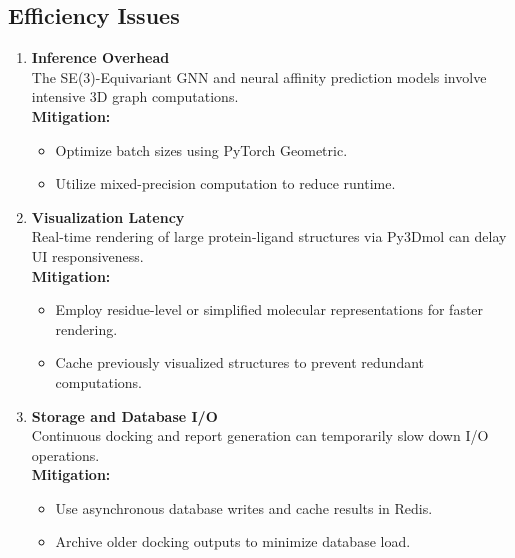 \documentclass[12pt,a4]{report}
\begin{document}
\subsection{Efficiency Issues}
\begin{enumerate}[label=\textbf{\Alph*.}, leftmargin=1.2cm]

    \item \textbf{Inference Overhead} \\
    \hspace{0.3in}
    The SE(3)-Equivariant GNN and neural affinity prediction models involve intensive 3D graph computations. \\
    \hspace{0.3in}
    \textbf{Mitigation:}
    \begin{itemize}
        \item Optimize batch sizes using PyTorch Geometric.
        \item Utilize mixed-precision computation to reduce runtime.
    \end{itemize}

    \vspace{0.4cm}
    \item \textbf{Visualization Latency} \\
    \hspace{0.3in}
    Real-time rendering of large protein-ligand structures via Py3Dmol can delay UI responsiveness. \\
    \hspace{0.3in}
    \textbf{Mitigation:}
    \begin{itemize}
        \item Employ residue-level or simplified molecular representations for faster rendering.
        \item Cache previously visualized structures to prevent redundant computations.
    \end{itemize}

    \vspace{0.4cm}
    \item \textbf{Storage and Database I/O} \\
    \hspace{0.3in}
    Continuous docking and report generation can temporarily slow down I/O operations. \\
    \hspace{0.3in}
    \textbf{Mitigation:}
    \begin{itemize}
        \item Use asynchronous database writes and cache results in Redis.
        \item Archive older docking outputs to minimize database load.
    \end{itemize}


\end{enumerate}
\end{document}
